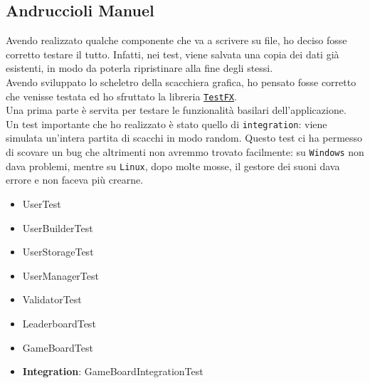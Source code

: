 \documentclass[a4paper,12pt]{report}
\begin{document}
\subsection{Andruccioli Manuel}
Avendo realizzato qualche componente che va a scrivere su file, ho deciso fosse corretto testare il tutto. Infatti, nei test, viene salvata una copia dei dati già esistenti, in modo da poterla ripristinare alla fine degli stessi.
\\
Avendo sviluppato lo scheletro della scacchiera grafica, ho pensato fosse corretto che venisse testata ed ho sfruttato la libreria \href{https://github.com/TestFX/TestFX}{\texttt{TestFX}}.
\\
Una prima parte è servita per testare le funzionalità basilari dell'applicazione.
\\
Un test importante che ho realizzato è stato quello di \texttt{integration}: viene simulata un'intera partita di scacchi in modo random. Questo test ci ha permesso di scovare un bug che altrimenti non avremmo trovato facilmente: su \texttt{Windows} non dava problemi, mentre su \texttt{Linux}, dopo molte mosse, il gestore dei suoni dava errore e non faceva più crearne.

\begin{itemize}
    \item UserTest
    \item UserBuilderTest
    \item UserStorageTest
    \item UserManagerTest
    \item ValidatorTest
    \item LeaderboardTest
    \item GameBoardTest
    \item \textbf{Integration}: GameBoardIntegrationTest
\end{itemize}
\end{document}
